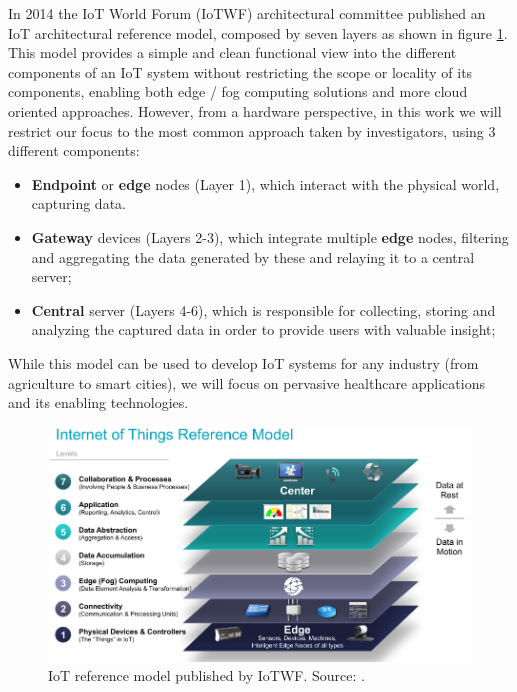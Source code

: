 In 2014 the \acs{IoT} World Forum (IoTWF) architectural committee published an \acs{IoT} architectural reference model, composed by seven layers as shown in figure \ref{fig:iotwf-referencemodel}. This model provides a simple and clean functional view into the different components of an \acs{IoT} system without restricting the scope or locality of its components, enabling both edge / fog computing solutions and more cloud oriented approaches. However, from a hardware perspective, in this work we will restrict our focus to the most common approach taken by investigators, using 3 different components: 

\begin{itemize}
    \item \textbf{Endpoint} or \textbf{edge} nodes (Layer 1), which interact with the physical world, capturing data.
    \item \textbf{Gateway} devices (Layers 2-3), which integrate multiple \textbf{edge} nodes, filtering and aggregating the data generated by these and relaying it to a central server; 
    \item \textbf{Central} server (Layers 4-6), which is responsible for collecting, storing and analyzing the captured data in order to provide users with valuable insight;
\end{itemize}

While this model can be used to develop IoT systems for any industry (from agriculture to smart cities), we will focus on pervasive healthcare applications and its enabling technologies. 


\begin{figure}[H]
    \centering
    \includegraphics[width=0.85\linewidth]{images/iotwf-referencemodel.png}
    \caption[IoT reference model published by IoTWF.]{IoT reference model published by IoTWF. Source: \cite{Cisco2014}.}
    \label{fig:iotwf-referencemodel}
\end{figure}

